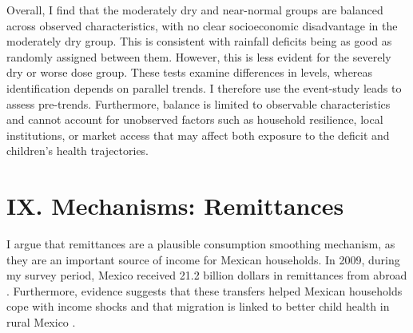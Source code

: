 \documentclass[12pt]{article}
\begin{document}
Overall, I find that the moderately dry and near-normal groups are balanced across observed characteristics, with no clear socioeconomic disadvantage in the moderately dry group. This is consistent with rainfall deficits being as good as randomly assigned between them. However, this is less evident for the severely dry or worse dose group. These tests examine differences in levels, whereas identification depends on parallel trends. I therefore use the event-study leads to assess pre-trends. Furthermore, balance is limited to observable characteristics and cannot account for unobserved factors such as household resilience, local institutions, or market access that may affect both exposure to the deficit and children's health trajectories.

\section*{IX. Mechanisms: Remittances}\label{sec:IX}

I argue that remittances are a plausible consumption smoothing mechanism, as they are an important source of income for Mexican households. In 2009, during my survey period, Mexico received 21.2 billion dollars in remittances from abroad \parencite{ordazdiazMigracionRemesas2011}. Furthermore, evidence suggests that these transfers helped Mexican households cope with income shocks \parencite{amuedo-dorantesRemittancesIncomeSmoothing2011} and that migration is linked to better child health in rural Mexico \parencite{hildebrandtEffectsMigrationChild2005}.
\end{document}
